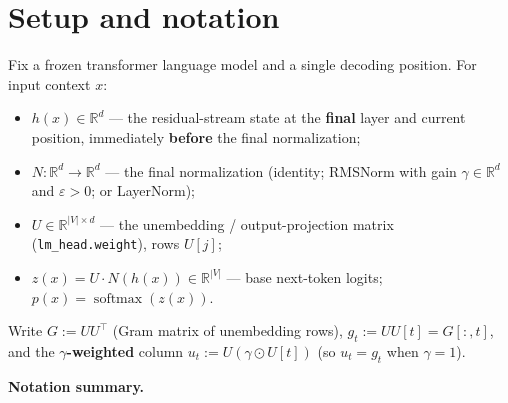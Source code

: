 \documentclass[11pt]{article}
\theoremstyle{plain}
\theoremstyle{definition}
\begin{document}
\section{Setup and notation}

Fix a frozen transformer language model and a single decoding position. For input context $x$:

\begin{itemize}
\item $h(x) \in \mathbb{R}^{d}$ --- the residual-stream state at the \textbf{final} layer and current position, immediately \textbf{before} the final normalization;
\item $N : \mathbb{R}^{d} \to \mathbb{R}^{d}$ --- the final normalization (identity; RMSNorm with gain $\gamma \in \mathbb{R}^{d}$ and $\varepsilon > 0$; or LayerNorm);
\item $U \in \mathbb{R}^{|V| \times d}$ --- the unembedding / output-projection matrix (\texttt{lm\_head.weight}), rows $U[j]$;
\item $z(x) = U \cdot N(h(x)) \in \mathbb{R}^{|V|}$ --- base next-token logits; $p(x) = \operatorname{softmax}(z(x))$.
\end{itemize}

Write $G := U U^{\top}$ (Gram matrix of unembedding rows), $g_t := U U[t] = G[:,t]$, and the \textbf{$\gamma$-weighted} column $u_t := U(\gamma \odot U[t])$ (so $u_t = g_t$ when $\gamma = 1$).

\textbf{Notation summary.}
\end{document}
